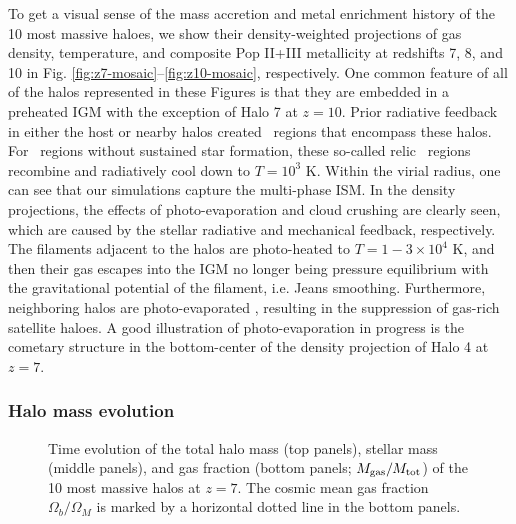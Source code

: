 \documentclass[useAMS,usenatbib]{mn2e}
\begin{document}
To get a visual sense of the mass accretion and metal enrichment
history of the 10 most massive haloes, we show their density-weighted
projections of gas density, temperature, and composite Pop II+III
metallicity at redshifts 7, 8, and 10 in
Fig. \ref{fig:z7-mosaic}--\ref{fig:z10-mosaic}, respectively.  One
common feature of all of the halos represented in these Figures is
that they are embedded in a preheated IGM with the exception of Halo 7
at $z=10$.  Prior radiative feedback in either the host or nearby
halos created \hii~regions that encompass these halos.  For
\hii~regions without sustained star formation, these so-called relic
\hii~regions recombine and radiatively cool down to $T = 10^3$ K.
Within the virial radius, one can see that our simulations capture the
multi-phase ISM.  In the density projections, the effects of
photo-evaporation and cloud crushing are clearly seen, which are
caused by the stellar radiative and mechanical feedback, respectively.
The filaments adjacent to the halos are photo-heated to $T = 1-3
\times 10^4$ K, and then their gas escapes into the IGM no longer
being pressure equilibrium with the gravitational potential of the
filament, i.e. Jeans smoothing.  Furthermore, neighboring halos are
photo-evaporated \citep[see][for the level of halo
  photo-evaporation]{Wise08_Reion}, resulting in the suppression of
gas-rich satellite haloes.  A good illustration of photo-evaporation
in progress is the cometary structure in the bottom-center of the
density projection of Halo 4 at $z=7$.


\subsubsection{Halo mass evolution}

\begin{figure}
  \caption{\label{fig:massevo} Time evolution of the total halo mass
    (top panels), stellar mass (middle panels), and gas fraction
    (bottom panels; $M_{\rm gas} / M_{\rm tot}$) of the 10 most
    massive halos at $z=7$.  The cosmic mean gas fraction $\Omega_b /
    \Omega_M$ is marked by a horizontal dotted line in the bottom
    panels.}
\end{figure}
\end{document}
